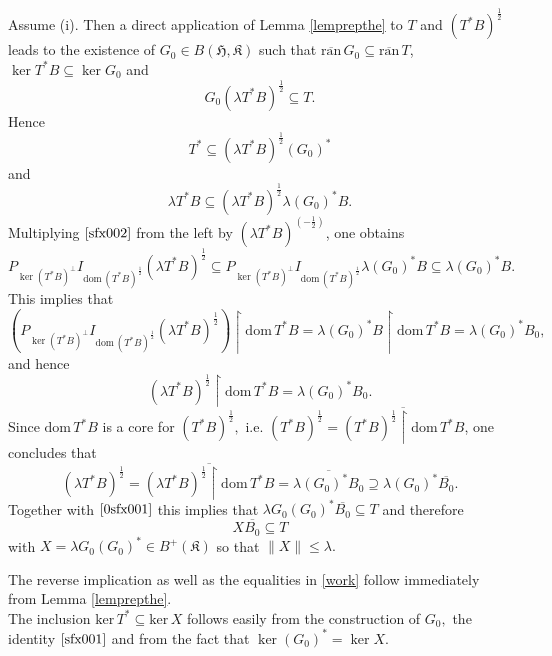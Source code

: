 \documentclass{amsart}
\makeatletter
\newcommand{\n}{\|}
\newcommand{\h}{\mathfrak{H}}
\newcommand{\kk}{\mathfrak{K}}
\newcommand{\kerr}{\mathrm{ker}\,}
\newcommand{\ranbar}{\overline{\mathrm{ran}}\,}
\newcommand{\ranbarT}{\mathrm{\overline{ran}}\, T}
\newcommand{\bhk}{B(\h,\kk)}
\newcommand{\D}{\mathrm{dom}\,}
\newcommand{\adj}{^*}
\newcommand{\tstar}{T^{*}}
\newcommand{\halfltsb}{(\lambda  T^*B)^{\frac{1}{2}}}
\newcommand{\halftsb}{( T^*B)^{\frac{1}{2}}}
\newcommand{\ppa}{P_{\ker( T^*B)^{\perp}}}
\newcommand{\inclu}{\subseteq}
\newcommand{\lplusk}{B^{+}(\kk)}
\newcommand{\rest}{\upharpoonright}
\numberwithin{equation}{section}
\renewenvironment{proof}[1][\proofname]{%
   \par\pushQED{\qed}\normalfont%
   \topsep6\p@\@plus6\p@\relax
   \trivlist\item[\hskip\labelsep\bfseries#1\@addpunct{.}]%
   \ignorespaces
}{%
   \popQED\endtrivlist\@endpefalse
}
\makeatother
\begin{document}
\begin{proof}
 Assume (i). Then  a direct application of Lemma \ref{lemprepthe} to $T$ and $\halftsb$   leads to the existence of  $G_0 \in \bhk$ such that $\ranbar G_0 \inclu \ranbarT$,  $ \ker \tstar B \inclu \ker G_0 $ and
     \begin{equation}\label{0sfx001}
          G_0 \halfltsb \inclu T.
      \end{equation}
     Hence
    \begin{equation}\label{sfx001}
    \tstar \inclu   \halfltsb (G_0)\adj
     \end{equation}
  and
      \begin{equation}\label{sfx002}
 \lambda    \tstar B \inclu \halfltsb \lambda  (G_0)\adj B.
     \end{equation}
Multiplying  $\eqref{sfx002}$   from the    left by $(\lambda \tstar B)^{(-\frac{1}{2})}$, one obtains
      \begin{equation}\label{choftek001}
                  \ppa I_{\D \halftsb} \halfltsb  \inclu  \ppa I_{\D \halftsb} \lambda (G_0)\adj B \inclu  \lambda (G_0)\adj B.
                   \end{equation}
This implies that
\[               
 (\ppa I_{\D \halftsb} \halfltsb) \rest \D \tstar B =  \lambda (G_0)\adj B \rest \D \tstar B= \lambda (G_0)\adj B_0,
\]                              
and hence
\begin{equation}\label{chotek002}
   \halfltsb \rest \D \tstar B=\lambda (G_0)\adj B_0.
\end{equation}
Since $\D \tstar B $ is a core for $\halftsb,$ i.e. $\halftsb =  \overline{\halftsb \rest \D \tstar B }$,  one concludes that
\begin{equation}\label{celine}
            \halfltsb=  \overline{\halfltsb \rest \D \tstar B}  =  \overline{\lambda (G_0)\adj B_0} \supseteq  \lambda (G_0)\adj \overline{B_0}.
\end{equation}
Together with $\eqref{0sfx001}$ this implies that
                $
             \lambda  G_0 (G_0)\adj \overline{B_0} \inclu T
                 $
                and therefore
                $$
                X \overline{B_0} \inclu T
                $$
                 with $ X=\lambda G_0 (G_0)\adj \in \lplusk$ so that  $\n X \n \leq \lambda.$

    \hspace*{0.4cm} The reverse implication as well as the equalities in \eqref{work} follow immediately from Lemma \ref{lemprepthe}. \\
  \hspace*{0.4cm} The inclusion $\kerr T\adj \inclu \kerr X$ follows easily from the construction of $G_0,$  the identity  $\eqref{sfx001}$ and from the fact that  $\ker (G_0)\adj= \ker X.$


\end{proof}
\end{document}
